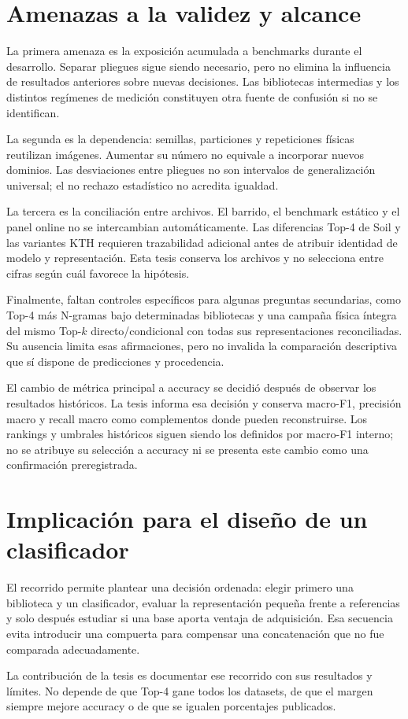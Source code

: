 \section{Amenazas a la validez y alcance}
La primera amenaza es la exposición acumulada a benchmarks durante el desarrollo. Separar pliegues sigue siendo necesario, pero no elimina la influencia de resultados anteriores sobre nuevas decisiones. Las bibliotecas intermedias y los distintos regímenes de medición constituyen otra fuente de confusión si no se identifican.

La segunda es la dependencia: semillas, particiones y repeticiones físicas reutilizan imágenes. Aumentar su número no equivale a incorporar nuevos dominios. Las desviaciones entre pliegues no son intervalos de generalización universal; el no rechazo estadístico no acredita igualdad.

La tercera es la conciliación entre archivos. El barrido, el benchmark estático y el panel online no se intercambian automáticamente. Las diferencias Top-4 de Soil y las variantes KTH requieren trazabilidad adicional antes de atribuir identidad de modelo y representación. Esta tesis conserva los archivos y no selecciona entre cifras según cuál favorece la hipótesis.

Finalmente, faltan controles específicos para algunas preguntas secundarias, como Top-4 más N-gramas bajo determinadas bibliotecas y una campaña física íntegra del mismo Top-\(k\) directo/condicional con todas sus representaciones reconciliadas. Su ausencia limita esas afirmaciones, pero no invalida la comparación descriptiva que sí dispone de predicciones y procedencia.

El cambio de métrica principal a accuracy se decidió después de observar los resultados históricos. La tesis informa esa decisión y conserva macro-F1, precisión macro y recall macro como complementos donde pueden reconstruirse. Los rankings y umbrales históricos siguen siendo los definidos por macro-F1 interno; no se atribuye su selección a accuracy ni se presenta este cambio como una confirmación preregistrada.

\section{Implicación para el diseño de un clasificador}
El recorrido permite plantear una decisión ordenada: elegir primero una biblioteca y un clasificador, evaluar la representación pequeña frente a referencias y solo después estudiar si una base aporta ventaja de adquisición. Esa secuencia evita introducir una compuerta para compensar una concatenación que no fue comparada adecuadamente.

La contribución de la tesis es documentar ese recorrido con sus resultados y límites. No depende de que Top-4 gane todos los datasets, de que el margen siempre mejore accuracy o de que se igualen porcentajes publicados.
